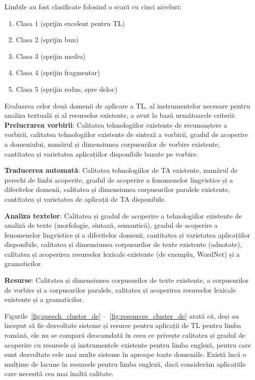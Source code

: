 \begin{multicols}{2}
Limbile au fost clasificate folosind o scară cu cinci niveluri:
\begin{enumerate}
      \item Clasa 1 (sprijin excelent pentru TL)
      \item Clasa 2 (sprijin bun)
      \item Clasa 3 (sprijin mediu)
      \item Clasa 4 (sprijin fragmentar) 
      \item Clasa 5 (sprijin redus, spre deloc)
\end{enumerate}

Evaluarea celor două domenii de aplicare a TL, al instrumentelor necesare pentru analiza textuală și al resurselor existente, a avut la bază următoarele criterii:
\textbf{Prelucrarea vorbirii}: Calitatea tehnologiilor existente de recunoaștere a vorbirii, calitatea tehnologiilor existente de sinteză a vorbirii, gradul de acoperire a domeniului, numărul și dimensiunea corpusurilor de vorbire existente, cantitatea și varietatea aplicațiilor disponibile bazate pe vorbire.

\textbf{Traducerea automată}: Calitatea tehnologiilor de TA existente, numărul de perechi de limbi acoperite, gradul de acoperire a fenomenelor lingvistice și a diferitelor domenii, calitatea și dimensiunea corpusurilor paralele existente, cantitatea și varietatea de aplicații de TA disponibile.

\textbf{Analiza textelor}: Calitatea și gradul de acoperire a tehnologiilor existente de analiză de texte (morfologie, sintaxă, semantică), gradul de acoperire a fenomenelor lingvistice și a diferitelor domenii, cantitatea și varietatea aplicațiilor disponibile, calitatea și dimensiunea corpusurilor de texte existente (adnotate), calitatea și acoperirea resurselor lexicale existente (de exemplu, WordNet) și a gramaticilor.

\textbf{Resurse}: Calitatea și dimensiunea corpusurilor de texte existente, a corpusurilor de vorbire și a corpusurilor paralele, calitatea și acoperirea resurselor lexicale existente și a gramaticilor.

Figurile~\ref{fig:speech_cluster_de} --~\ref{fig:resources_cluster_de} arată că, deși au început să fie dezvoltate sisteme și resurse pentru aplicații de TL pentru limba română, ele nu se compară deocamdată în ceea ce privește calitatea și gradul de acoperire cu resursele și instrumentele existente pentru limba engleză, pentru care sunt dezvoltate cele mai multe sisteme în aproape toate domeniile. Există încă o mulțime de lacune în resursele pentru limba engleză, dacă considerăm aplicațiile care necesită cea mai înaltă calitate.


\end{multicols}
